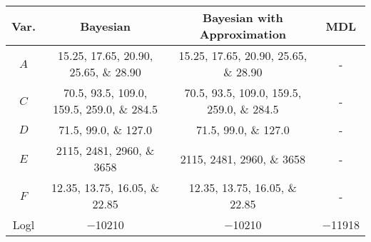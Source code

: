 \scriptsize
\begin{tabular}{@{}cccc@{}}
    \toprule
    Var. & Bayesian & Bayesian with Approximation & MDL \\
    \midrule
    $A$ & \numlist[list-final-separator = {, }]{15.25; 17.65; 20.90; 25.65; 28.90} & \numlist[list-final-separator = {, }]{15.25; 17.65; 20.90; 25.65; 28.90} & - \\
    $C$ & \numlist[list-final-separator = {, }]{70.5; 93.5; 109.0; 159.5; 259.0; 284.5} & \numlist[list-final-separator = {, }]{70.5;93.5;109.0;159.5;259.0;284.5} & - \\
    $D$ & \numlist[list-final-separator = {, }]{71.5;99.0;127.0} & \numlist[list-final-separator = {, }]{71.5;99.0; 127.0} & - \\
    $E$ & \numlist[list-final-separator = {, }]{2115;2481;2960;3658} & \numlist[list-final-separator = {, }]{2115;2481;2960;3658} & - \\
    $F$ & \numlist[list-final-separator = {, }]{12.35;13.75;16.05;22.85} & \numlist[list-final-separator = {, }]{12.35;13.75;16.05;22.85} & - \\
    \addlinespace[0.5em]
    Logl & \num{-10210} & \num{-10210} & \num{-11918} \\
    \bottomrule
\end{tabular}